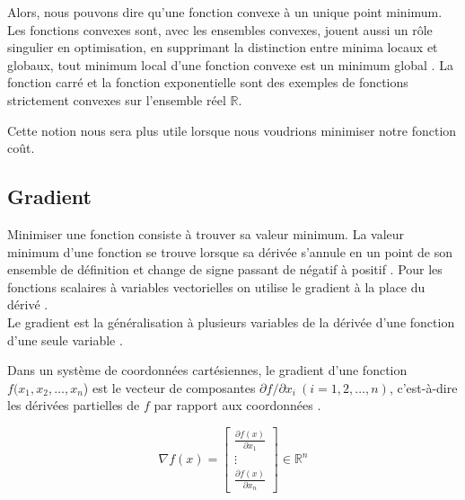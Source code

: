 		Alors, nous pouvons dire qu'une fonction convexe à un unique point minimum. Les fonctions convexes sont, avec les ensembles convexes, jouent aussi un rôle singulier en optimisation, en supprimant la distinction entre minima locaux et globaux, tout minimum local d'une fonction convexe est un minimum global \cite{coulombeau2013math}.
		La fonction carré et la fonction exponentielle sont des exemples de fonctions strictement convexes sur l'ensemble réel $\mathbb {R} $.
		
		Cette notion nous sera plus utile lorsque nous voudrions minimiser notre fonction coût.  
		
		\subsection{{Gradient}}\label{sec:gradient}
		Minimiser une fonction consiste à trouver sa valeur minimum. La valeur minimum d'une fonction se trouve lorsque sa dérivée s'annule en un point de son ensemble de définition et change de signe passant de négatif à positif \cite{coulombeau2013math}. Pour les fonctions scalaires à variables vectorielles on utilise le gradient à la place du dérivé \cite{jtshiman:2021}.\\
		Le gradient est la généralisation à plusieurs variables de la dérivée d'une fonction d'une seule variable \cite{benner2015numerical, bierlaire2006introduction}.%
		
		Dans un système de coordonnées cartésiennes, le gradient d'une fonction {$ f(x_{1},x_{2},\dots ,x_{n}$)} est le vecteur de composantes {$ \partial f/ \partial x_{i}\ (i=1,2,\dots ,n)$}, c'est-à-dire les dérivées partielles de $f$ par rapport aux coordonnées \cite{jtshiman:2021}.
		
		\begin{equation}
			{\nabla f(x)={
					\begin{bmatrix}
					{\frac {\partial f(x)}{\partial x_{1}}}\\
					\vdots \\
					{\frac {\partial f(x)}{\partial x_{n}}}
					\end{bmatrix}}} \in \mathbb{R}^n 
		\end{equation}
		
